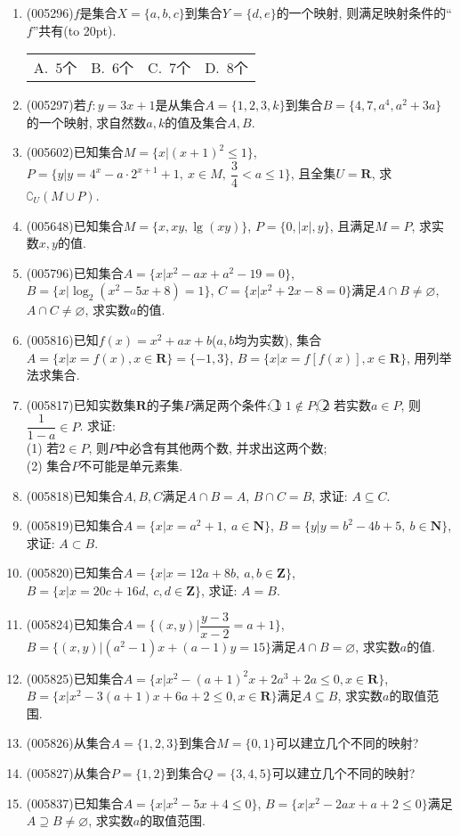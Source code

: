 \documentclass[10pt,a4paper]{article}
\newcommand{\bracket}[1]{(\hbox to #1pt{})}
\newcommand{\fourch}[4]{\par\begin{tabular}{p{.23\textwidth}p{.23\textwidth}p{.23\textwidth}p{.23\textwidth}}
A.~#1 &B.~#2& C.~#3& D.~#4
\end{tabular}}
\begin{document}
\begin{enumerate}[1.]
\item {\tiny (005296)}$f$是集合$X=\{a,b,c\}$到集合$Y=\{d,e\}$的一个映射, 则满足映射条件的``$f$''共有\bracket{20}.
\fourch{$5$个}{$6$个}{$7$个}{$8$个}
\item {\tiny (005297)}若$f:y=3x+1$是从集合$A=\{1,2,3,k\}$到集合$B=\{4,7,a^4,a^2+3a\}$的一个映射, 求自然数$a,k$的值及集合$A,B$.
\item {\tiny (005602)}已知集合$M=\{x|(x+1)^2\le 1\}$, $P=\{y|y=4^x-a\cdot 2^{x+1}+1,\ x\in M,\ \dfrac 34<a\le 1\}$, 且全集$U=\mathbf{R}$, 求$\complement _U(M\cup P)$.
\item {\tiny (005648)}已知集合$M=\{x,xy,\lg (xy)\}$, $P=\{0,|x|,y\}$, 且满足$M=P$, 求实数$x,y$的值.
\item {\tiny (005796)}已知集合$A=\{x|x^2-ax+a^2-19=0\}$, $B=\{x|\log_2(x^2-5x+8)=1\}$, $C=\{x|x^2+2x-8=0\}$满足$A\cap B\ne \varnothing$, $A\cap C\ne \varnothing$, 求实数$a$的值.
\item {\tiny (005816)}已知$f(x)=x^2+ax+b$($a,b$均为实数), 集合$A=\{x|x=f(x) ,x\in \mathbf{R}\}=\{-1,3\}$, $B=\{x|x=f[f(x)],x\in \mathbf{R}\}$, 用列举法求集合.
\item {\tiny (005817)}已知实数集$\mathbf{R}$的子集$P$满足两个条件: \textcircled{1} $1\notin P$; \textcircled{2} 若实数$a\in P$, 则$\dfrac 1{1-a}\in P$. 求证:\\
(1) 若$2\in P$, 则$P$中必含有其他两个数, 并求出这两个数;\\
(2) 集合$P$不可能是单元素集.
\item {\tiny (005818)}已知集合$A,B,C$满足$A\cap B=A$, $B\cap C=B$, 求证: $A\subseteq C$.
\item {\tiny (005819)}已知集合$A=\{x|x=a^2+1,\ a\in \mathbf{N}\}$, $B=\{y|y=b^2-4b+5,\ b\in \mathbf{N}\}$, 求证: $A\subset B$.
\item {\tiny (005820)}已知集合$A=\{x|x=12a+8b,\ a,b\in \mathbf{Z}\}$, $B=\{x|x=20c+16d,\ c,d\in \mathbf{Z}\}$, 求证: $A=B$.
\item {\tiny (005824)}已知集合$A=\{(x,y)|\dfrac{y-3}{x-2}=a+1\}$, $B=\{(x,y)|(a^2-1)x+(a-1)y=15\}$满足$A\cap B=\varnothing$, 求实数$a$的值.
\item {\tiny (005825)}已知集合$A=\{x|x^2-(a+1)^2x+2a^3+2a\le 0,x\in \mathbf{R}\}$, $B=\{x|x^2-3(a+1)x+6a+2\le 0,x\in \mathbf{R}\}$满足$A\subseteq B$, 求实数$a$的取值范围.
\item {\tiny (005826)}从集合$A=\{1,2,3\}$到集合$M=\{0,1\}$可以建立几个不同的映射?
\item {\tiny (005827)}从集合$P=\{1,2\}$到集合$Q=\{3,4,5\}$可以建立几个不同的映射?
\item {\tiny (005837)}已知集合$A=\{x|x^2-5x+4\le 0\}$, $B=\{x|x^2-2ax+a+2\le 0\}$满足$A\supseteq B\ne \varnothing$, 求实数$a$的取值范围.

\end{enumerate}
\end{document}
